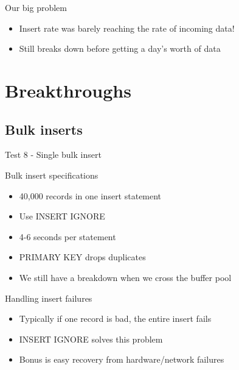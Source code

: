 \documentclass{beamer}
\begin{document}
\begin{frame}{Our big problem}
  \begin{block}{}
    \begin{itemize}
    \item Insert rate was barely reaching the rate of incoming data!
    \item Still breaks down before getting a day's worth of data
    \end{itemize}
  \end{block}
  \parbox[c][0.4\paperheight]{\paperwidth}{ }
\end{frame}

\section{Breakthroughs}
\subsection{Bulk inserts}
\begin{frame}{Test 8 - Single bulk insert}
\end{frame}

\begin{frame}{Bulk insert specifications}
  \begin{itemize}
  \item 40,000 records in one insert statement
  \item Use INSERT IGNORE
  \item 4-6 seconds per statement
  \item PRIMARY KEY drops duplicates
  \item We still have a breakdown when we cross the buffer pool
  \end{itemize}
\end{frame}

\begin{frame}{Handling insert failures}
  \begin{itemize}
  \item Typically if one record is bad, the entire insert fails
  \item INSERT IGNORE solves this problem
  \item Bonus is easy recovery from hardware/network failures
  \end{itemize}
\end{frame}
\end{document}

